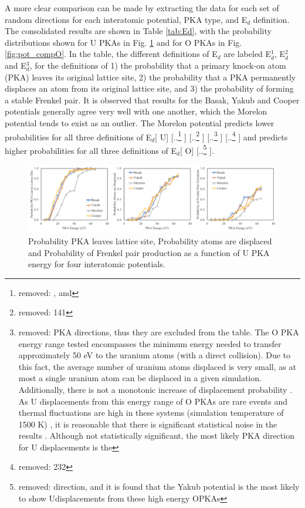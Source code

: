 \documentclass[review]{elsarticle} %
\providecommand{\DIFaddtex}[1]{{\protect\color{blue} \sf #1}} %
\providecommand{\DIFdeltex}[1]{{\protect\color{red} [..\footnote{removed: #1} ]}} %
\providecommand{\DIFaddbegin}{} %
\providecommand{\DIFaddend}{} %
\providecommand{\DIFdelbegin}{} %
\providecommand{\DIFdelend}{} %
\providecommand{\DIFaddFL}[1]{\DIFadd{#1}} %
\providecommand{\DIFaddbeginFL}{} %
\providecommand{\DIFdelendFL}{} %
\providecommand{\DIFadd}[1]{\texorpdfstring{\DIFaddtex{#1}}{#1}} %
\providecommand{\DIFdel}[1]{\texorpdfstring{\DIFdeltex{#1}}{}} %
\newcommand{\DIFscaledelfig}{0.5}
\newlength{\DIFdelgraphicswidth} %
\newlength{\DIFdelgraphicsheight} %
\newcommand{\DIFaddincludegraphics}[2][]{{\color{blue}\fbox{\DIFOincludegraphics[#1]{#2}}}} %
\newcommand{\DIFdelincludegraphics}[2][]{%
\sbox{\DIFdelgraphicsbox}{\DIFOincludegraphics[#1]{#2}}%
\settoboxwidth{\DIFdelgraphicswidth}{\DIFdelgraphicsbox} %
\settoboxtotalheight{\DIFdelgraphicsheight}{\DIFdelgraphicsbox} %
\scalebox{\DIFscaledelfig}{%
\parbox[b]{\DIFdelgraphicswidth}{\usebox{\DIFdelgraphicsbox}\\[-\baselineskip] \rule{\DIFdelgraphicswidth}{0em}}\llap{\resizebox{\DIFdelgraphicswidth}{\DIFdelgraphicsheight}{%
\setlength{\unitlength}{\DIFdelgraphicswidth}%
\begin{picture}(1,1)%
\thicklines\linethickness{2pt} %
{\color[rgb]{1,0,0}\put(0,0){\framebox(1,1){}}}%
{\color[rgb]{1,0,0}\put(0,0){\line( 1,1){1}}}%
{\color[rgb]{1,0,0}\put(0,1){\line(1,-1){1}}}%
\end{picture}%
}\hspace*{3pt}}} %
} %
\DeclareRobustCommand{\DIFaddbegin}{\DIFOaddbegin \let\includegraphics\DIFaddincludegraphics} %
\DeclareRobustCommand{\DIFaddend}{\DIFOaddend \let\includegraphics\DIFOincludegraphics} %
\DeclareRobustCommand{\DIFdelbegin}{\DIFOdelbegin \let\includegraphics\DIFdelincludegraphics} %
\DeclareRobustCommand{\DIFdelend}{\DIFOaddend \let\includegraphics\DIFOincludegraphics} %
\DeclareRobustCommand{\DIFaddbeginFL}{\DIFOaddbeginFL \let\includegraphics\DIFaddincludegraphics} %
\DeclareRobustCommand{\DIFdelendFL}{\DIFOaddendFL \let\includegraphics\DIFOincludegraphics} %
\begin{document}
\DIFadd{A more clear comparison can be made by extracting the data for each set of random directions for each interatomic potential, PKA type, and E$_d$ definition. The consolidated results are shown in Table \ref{tab:Ed}, with the probability distributions shown for U PKAs in Fig. \ref{fig:pot_compU} and for O PKAs in Fig. \ref{fig:pot_compO}. In the table, the different definitions of E$_d$ are labeled E$_d^1$, E$_d^2$ and E$_d^3$, for the definitions of 1) the probability that a primary knock-on atom (PKA) leaves its original lattice site, 2) the probability that a PKA permanently displaces an atom from its original lattice site, and 3) the probability of forming a stable Frenkel pair. It is observed that results for the Basak, Yakub and Cooper potentials generally agree very well with one another, which the Morelon potential tends to exist as an outlier. The Morelon potential predicts lower probabilities for all three definitions of E$_d$}[\DIFadd{U}\DIFaddend ] \DIFdelbegin \DIFdel{, and }%
\DIFdel{141}%
\DIFdel{PKA directions, thus they are excluded from the table. The O PKA energy range tested encompasses the minimum energy needed to transfer approximately 50 eV to the uranium atoms (with a direct collision). Due to this fact, the average number of uranium atoms displaced is very small, as at most a single uranium atom can be displaced in a given simulation. Additionally, there is not a monotonic increase of displacement probability . As U displacements from this energy range of O PKAs are rare events and thermal fluctuations are high in these systems (simulation temperature of 1500 K) , it is reasonable that there is significant statistical noise in the results . Although not statistically significant, the most likely PKA direction for U displacements is the }%
\DIFdel{232}\DIFdelend \DIFaddbegin \DIFadd{and predicts higher probabilities for all three definitions  of E$_d$}[\DIFadd{O}\DIFaddend ]\DIFdelbegin \DIFdel{direction, and it is found that the Yakub potential is the most likely to show Udisplacements from these high energy OPKAs}\DIFdelend .

\DIFdelbegin %
\DIFdelendFL \DIFaddbeginFL \begin{figure}[h]
 \centering
 \includegraphics[width=1.0\textwidth]{pot_compU.png}
 \caption{\DIFaddFL{Probability PKA leaves lattice site, Probability atoms are displaced and Probability of Frenkel pair production as a function of U PKA energy for four interatomic potentials. }}
 \label{fig:pot_compU}
\end{figure}
\end{document}
